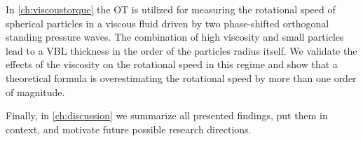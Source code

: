 In \cref{ch:viscoustorque} the OT is utilized for measuring the rotational 
speed of spherical particles in a viscous fluid driven by two phase-shifted 
orthogonal standing pressure waves. The combination of high viscosity and small 
particles lead to a VBL thickness in the order of the particles radius itself.  
We validate the effects of the viscosity on the rotational speed in this regime 
and show that a theoretical formula is overestimating the rotational speed by 
more than one order of magnitude.

Finally, in \cref{ch:discussion} we summarize all presented findings, put them 
in context, and motivate future possible research directions.
